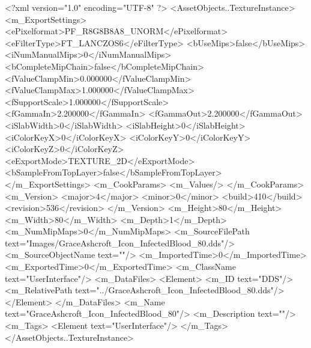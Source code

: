 <?xml version="1.0" encoding="UTF-8" ?>
<AssetObjects..TextureInstance>
	<m_ExportSettings>
		<ePixelformat>PF_R8G8B8A8_UNORM</ePixelformat>
		<eFilterType>FT_LANCZOS6</eFilterType>
		<bUseMips>false</bUseMips>
		<iNumManualMips>0</iNumManualMips>
		<bCompleteMipChain>false</bCompleteMipChain>
		<fValueClampMin>0.000000</fValueClampMin>
		<fValueClampMax>1.000000</fValueClampMax>
		<fSupportScale>1.000000</fSupportScale>
		<fGammaIn>2.200000</fGammaIn>
		<fGammaOut>2.200000</fGammaOut>
		<iSlabWidth>0</iSlabWidth>
		<iSlabHeight>0</iSlabHeight>
		<iColorKeyX>0</iColorKeyX>
		<iColorKeyY>0</iColorKeyY>
		<iColorKeyZ>0</iColorKeyZ>
		<eExportMode>TEXTURE_2D</eExportMode>
		<bSampleFromTopLayer>false</bSampleFromTopLayer>
	</m_ExportSettings>
	<m_CookParams>
		<m_Values/>
	</m_CookParams>
	<m_Version>
		<major>4</major>
		<minor>0</minor>
		<build>410</build>
		<revision>536</revision>
	</m_Version>
	<m_Height>80</m_Height>
	<m_Width>80</m_Width>
	<m_Depth>1</m_Depth>
	<m_NumMipMaps>0</m_NumMipMaps>
	<m_SourceFilePath text="Images/GraceAshcroft_Icon_InfectedBlood_80.dds"/>
	<m_SourceObjectName text=""/>
	<m_ImportedTime>0</m_ImportedTime>
	<m_ExportedTime>0</m_ExportedTime>
	<m_ClassName text="UserInterface"/>
	<m_DataFiles>
		<Element>
			<m_ID text="DDS"/>
			<m_RelativePath text="../GraceAshcroft_Icon_InfectedBlood_80.dds"/>
		</Element>
	</m_DataFiles>
	<m_Name text="GraceAshcroft_Icon_InfectedBlood_80"/>
	<m_Description text=""/>
	<m_Tags>
		<Element text="UserInterface"/>
	</m_Tags>
</AssetObjects..TextureInstance>

